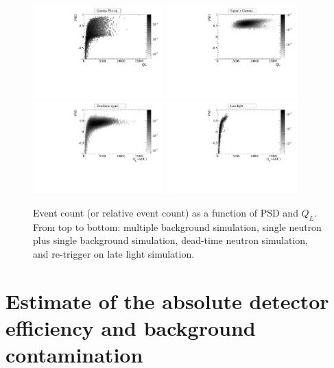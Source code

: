 \documentclass[twocolumn]{bmcart}
\begin{document}
\begin{figure}[!htpb]
\centering
\includegraphics[width=0.45\textwidth]{figures/hbgpile_psdql.pdf}
\includegraphics[width=0.45\textwidth]{figures/hsigbg_psdql.pdf}
\includegraphics[width=0.45\textwidth]{figures/hlate_psdql.pdf}
\includegraphics[width=0.45\textwidth]{figures/hretrig_psdql.pdf}
\caption{ Event count (or relative event count) as a function of PSD
  and $Q_L$.  From top to bottom: multiple background simulation,
  single neutron plus single background simulation, dead-time neutron
  simulation, and re-trigger on late light simulation.}
\label{fig:eventSpectra2}
\end{figure}


\section{Estimate of the absolute detector efficiency and background contamination}\label{sec:eff}
\end{document}
